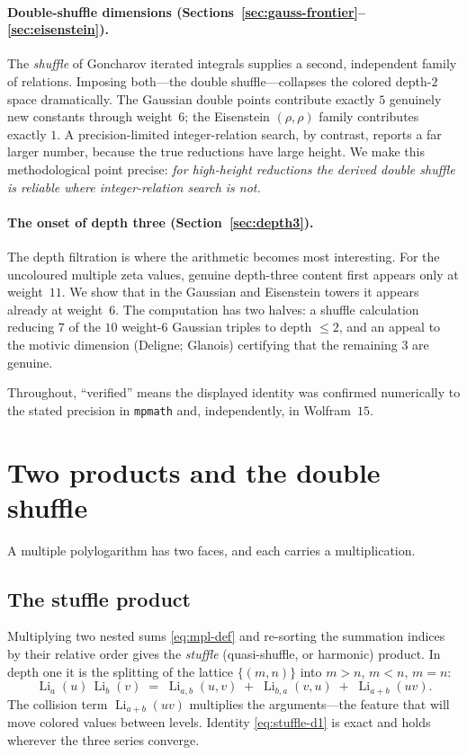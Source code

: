 \documentclass[11pt]{article}
\DeclareMathOperator{\Li}{Li}
\theoremstyle{plain}
\theoremstyle{remark}
\begin{document}
\paragraph{Double-shuffle dimensions (Sections~\ref{sec:gauss-frontier}--\ref{sec:eisenstein}).} The
\emph{shuffle} of Goncharov iterated integrals supplies a second, independent family of relations.
Imposing both---the double shuffle---collapses the colored depth-$2$ space dramatically. The Gaussian
double points contribute exactly $5$ genuinely new constants through weight~$6$; the Eisenstein
$(\rho,\rho)$ family contributes exactly $1$. A precision-limited integer-relation search, by
contrast, reports a far larger number, because the true reductions have large height. We make this
methodological point precise: \emph{for high-height reductions the derived double shuffle is reliable
where integer-relation search is not.}

\paragraph{The onset of depth three (Section~\ref{sec:depth3}).} The depth filtration is where the
arithmetic becomes most interesting. For the uncoloured multiple zeta values, genuine depth-three
content first appears only at weight~$11$. We show that in the Gaussian and Eisenstein towers it
appears already at weight~$6$. The computation has two halves: a shuffle calculation reducing $7$ of
the $10$ weight-$6$ Gaussian triples to depth $\le2$, and an appeal to the motivic dimension
(Deligne; Glanois) certifying that the remaining $3$ are genuine.

Throughout, ``verified'' means the displayed identity was confirmed numerically to the stated
precision in \texttt{mpmath} and, independently, in Wolfram~$15$.

\section{Two products and the double shuffle}\label{sec:stuffle}

A multiple polylogarithm has two faces, and each carries a multiplication.

\subsection{The stuffle product}

Multiplying two nested sums \eqref{eq:mpl-def} and re-sorting the summation indices by their relative
order gives the \emph{stuffle} (quasi-shuffle, or harmonic) product. In depth one it is the splitting
of the lattice $\{(m,n)\}$ into $m>n$, $m<n$, $m=n$:
\begin{equation}\label{eq:stuffle-d1}
  \Li_a(u)\,\Li_b(v)\;=\;\Li_{a,b}(u,v)\;+\;\Li_{b,a}(v,u)\;+\;\Li_{a+b}(uv).
\end{equation}
The collision term $\Li_{a+b}(uv)$ multiplies the arguments---the feature that will move colored
values between levels. Identity \eqref{eq:stuffle-d1} is exact and holds wherever the three series
converge.
\end{document}

